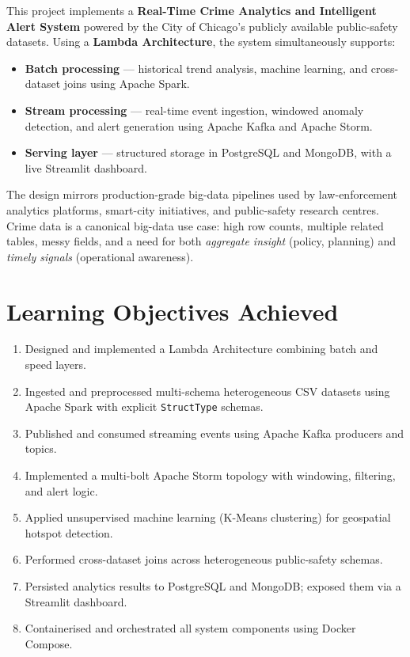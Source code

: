 \documentclass[12pt,a4paper]{article}
\begin{document}
This project implements a \textbf{Real-Time Crime Analytics and Intelligent Alert System} powered by the City of Chicago's publicly available public-safety datasets. Using a \textbf{Lambda Architecture}, the system simultaneously supports:

\begin{itemize}[leftmargin=1.6em]
  \item \textbf{Batch processing} — historical trend analysis, machine learning, and cross-dataset joins using Apache Spark.
  \item \textbf{Stream processing} — real-time event ingestion, windowed anomaly detection, and alert generation using Apache Kafka and Apache Storm.
  \item \textbf{Serving layer} — structured storage in PostgreSQL and MongoDB, with a live Streamlit dashboard.
\end{itemize}

The design mirrors production-grade big-data pipelines used by law-enforcement analytics platforms, smart-city initiatives, and public-safety research centres. Crime data is a canonical big-data use case: high row counts, multiple related tables, messy fields, and a need for both \emph{aggregate insight} (policy, planning) and \emph{timely signals} (operational awareness).

\section{Learning Objectives Achieved}

\begin{enumerate}[leftmargin=1.8em]
  \item Designed and implemented a Lambda Architecture combining batch and speed layers.
  \item Ingested and preprocessed multi-schema heterogeneous CSV datasets using Apache Spark with explicit \texttt{StructType} schemas.
  \item Published and consumed streaming events using Apache Kafka producers and topics.
  \item Implemented a multi-bolt Apache Storm topology with windowing, filtering, and alert logic.
  \item Applied unsupervised machine learning (K-Means clustering) for geospatial hotspot detection.
  \item Performed cross-dataset joins across heterogeneous public-safety schemas.
  \item Persisted analytics results to PostgreSQL and MongoDB; exposed them via a Streamlit dashboard.
  \item Containerised and orchestrated all system components using Docker Compose.
\end{enumerate}
\end{document}
